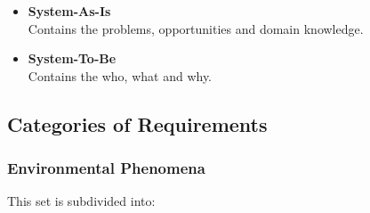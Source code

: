 \documentclass{article}
\begin{document}
\begin{itemize}
	\item \textbf{System-As-Is}
	\vspace{.2cm} \\
	Contains the problems, opportunities and domain knowledge.
	
	\item \textbf{System-To-Be}
	\vspace{.2cm} \\
	Contains the who, what and why.
\end{itemize}

\subsection{Categories of Requirements}
\subsubsection{Environmental Phenomena}
This set is subdivided into:
\end{document}
